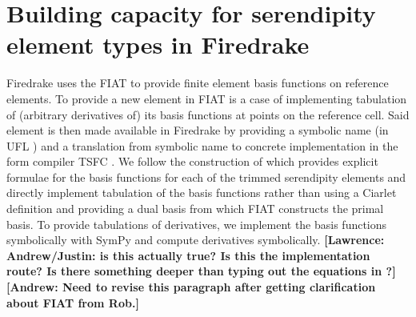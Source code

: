 \documentclass[format=acmsmall,screen,timestamp=false,a4paper]{acmart}
\DeclareMathOperator{\Div}{div}
\DeclareMathOperator{\curl}{curl}
\newcommand\akg[1]{\textbf{\textcolor[rgb]{.5,0,1}{[Andrew: #1]}}}
\newcommand\lm[1]{\textbf{\textcolor[rgb]{1,0,0.5}{[Lawrence: #1]}}}
\newcommand{\hcurl}{\ensuremath{{H}(\curl)}\xspace}
\newcommand{\hdiv}{\ensuremath{{H}(\Div)}\xspace}
\begin{document}
  
  
  \section{Building capacity for serendipity element types in Firedrake}
  \label{sec:buildcap}

  Firedrake uses the FIAT \cite{kirby2004algorithm,kirby2012fiat} to provide finite element basis functions on reference elements. To provide a new element in FIAT is a case of implementing tabulation of (arbitrary derivatives of) its basis functions at points on the reference cell. Said element is then made available in Firedrake by providing a symbolic name (in UFL \cite{alnaes2014unified}) and a translation from symbolic name to concrete implementation in the form compiler TSFC \cite{homolya2018tsfc}. We follow the construction of \cite{gillette2019computational} which provides explicit formulae for the basis functions for each of the trimmed serendipity elements and directly implement tabulation of the basis functions rather than using a Ciarlet definition and providing a dual basis from which FIAT constructs the primal basis. To provide tabulations of derivatives, we implement the basis functions symbolically with SymPy \cite{sympy2017} and compute derivatives symbolically. \lm{Andrew/Justin: is this actually true? Is this the implementation route? Is there something deeper than typing out the equations in \cite{gillette2019computational}?}\akg{Need to revise this paragraph after getting clarification about FIAT from Rob.}
  
\end{document}
